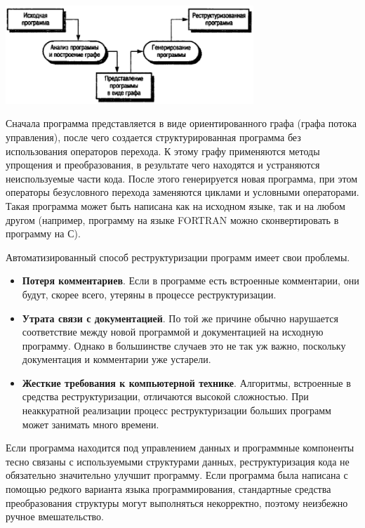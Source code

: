 \documentclass{../../text-style}
\begin{document}
\begin{center}
    \includegraphics[width=0.7\textwidth]{programStructureReengineering.png}
\end{center}

Сначала программа представляется в виде ориентированного графа (графа потока управления), после чего создается структурированная программа без использования операторов перехода. К этому графу применяются методы упрощения и преобразования, в результате чего находятся и устраняются неиспользуемые части кода. После этого генерируется новая программа, при этом операторы безусловного перехода заменяются циклами и условными операторами. Такая программа может быть написана как на исходном языке, так и на любом другом (например, программу на языке FORTRAN можно сконвертировать в программу на С).

Автоматизированный способ реструктуризации программ имеет свои проблемы.

\begin{itemize}
    \item \textbf{Потеря комментариев}. Если в программе есть встроенные комментарии, они будут, скорее всего, утеряны в процессе реструктуризации.
    \item \textbf{Утрата связи с документацией}. По той же причине обычно нарушается соответствие между новой программой и документацией на исходную программу. Однако в большинстве случаев это не так уж важно, поскольку документация и комментарии уже устарели.
    \item \textbf{Жесткие требования к компьютерной технике}. Алгоритмы, встроенные в средства реструктуризации, отличаются высокой сложностью. При неаккуратной реализации процесс реструктуризации больших программ может занимать много времени.
\end{itemize}

Если программа находится под управлением данных и программные компоненты тесно связаны с используемыми структурами данных, реструктуризация кода не обязательно значительно улучшит программу. Если программа была написана с помощью редкого варианта языка программирования, стандартные средства преобразования структуры могут выполняться некорректно, поэтому неизбежно ручное вмешательство.
\end{document}
